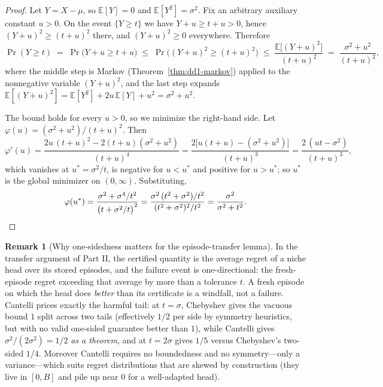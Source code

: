 \documentclass[11pt,a4paper]{article}
\theoremstyle{definition}
\newtheorem{remark}{Remark}[section]
\theoremstyle{plain}
\newcommand{\E}{\mathbb{E}}
\begin{document}
\begin{proof}
Let $Y = X - \mu$, so $\E[Y] = 0$ and $\E[Y^2] = \sigma^2$. Fix an arbitrary
auxiliary constant $u > 0$. On the event $\{Y \ge t\}$ we have
$Y + u \ge t + u > 0$, hence $(Y + u)^2 \ge (t + u)^2$ there, and
$(Y+u)^2 \ge 0$ everywhere. Therefore
\[
\Pr( Y \ge t )
\;=\; \Pr\bigl( Y + u \ge t + u \bigr)
\;\le\; \Pr\bigl( (Y + u)^2 \ge (t + u)^2 \bigr)
\;\le\; \frac{\E\bigl[(Y + u)^2\bigr]}{(t + u)^2}
\;=\; \frac{\sigma^2 + u^2}{(t + u)^2},
\]
where the middle step is Markov (Theorem~\ref{thm:dd1-markov}) applied to the
nonnegative variable $(Y + u)^2$, and the last step expands
$\E[(Y+u)^2] = \E[Y^2] + 2u\,\E[Y] + u^2 = \sigma^2 + u^2$.

The bound holds for every $u > 0$, so we minimize the right-hand side. Let
$\varphi(u) = (\sigma^2 + u^2)/(t + u)^2$. Then
\[
\varphi'(u)
= \frac{2u\,(t+u)^2 - 2(t+u)(\sigma^2 + u^2)}{(t+u)^4}
= \frac{2\bigl[u(t + u) - (\sigma^2 + u^2)\bigr]}{(t+u)^3}
= \frac{2\,(ut - \sigma^2)}{(t+u)^3},
\]
which vanishes at $u^* = \sigma^2 / t$, is negative for $u < u^*$ and positive
for $u > u^*$; so $u^*$ is the global minimizer on $(0, \infty)$.
Substituting,
\[
\varphi(u^*)
= \frac{\sigma^2 + \sigma^4/t^2}{\bigl(t + \sigma^2/t\bigr)^2}
= \frac{\sigma^2\,(t^2 + \sigma^2)/t^2}{(t^2 + \sigma^2)^2 / t^2}
= \frac{\sigma^2}{\sigma^2 + t^2}. \qedhere
\]
\end{proof}

\begin{remark}[Why one-sidedness matters for the episode-transfer lemma]
\label{rem:dd1-onesided}
In the transfer argument of Part II, the certified quantity is the average
regret of a niche head over its stored episodes, and the failure event is
one-directional: the fresh-episode regret exceeding that average by more than
a tolerance $t$. A fresh episode on which the head does \emph{better} than
its certificate is a windfall, not a failure. Cantelli prices exactly the
harmful tail: at $t = \sigma$, Chebyshev gives the vacuous bound $1$ split
across two tails (effectively $1/2$ per side by symmetry heuristics, but with
no valid one-sided guarantee better than $1$), while Cantelli gives
$\sigma^2/(2\sigma^2) = 1/2$ \emph{as a theorem}, and at $t = 2\sigma$ gives
$1/5$ versus Chebyshev's two-sided $1/4$. Moreover Cantelli requires no
boundedness and no symmetry---only a variance---which suits regret
distributions that are skewed by construction (they live in $[0, B]$ and pile
up near $0$ for a well-adapted head).
\end{remark}
\end{document}
